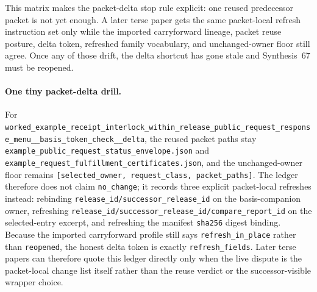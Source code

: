 \documentclass[11pt]{article}
\begin{document}
This matrix makes the packet-delta stop rule explicit: one reused predecessor packet is not yet enough. A later terse paper gets the same packet-local refresh instruction set only while the imported carryforward lineage, packet reuse posture, delta token, refreshed family vocabulary, and unchanged-owner floor still agree. Once any of those drift, the delta shortcut has gone stale and Synthesis~67 must be reopened.\cite{series:workedexample}

\paragraph{One tiny packet-delta drill.}
For \nolinkurl{worked_example_receipt_interlock_within_release_public_request_response_menu__basis_token_check__delta}, the reused packet paths stay \nolinkurl{example_public_request_status_envelope.json} and \nolinkurl{example_request_fulfillment_certificates.json}, and the unchanged-owner floor remains \nolinkurl{[selected_owner, request_class, packet_paths]}. The ledger therefore does not claim \nolinkurl{no_change}; it records three explicit packet-local refreshes instead: rebinding \nolinkurl{release_id/successor_release_id} on the basis-companion owner, refreshing \nolinkurl{release_id/successor_release_id/compare_report_id} on the selected-entry excerpt, and refreshing the manifest \nolinkurl{sha256} digest binding. Because the imported carryforward profile still says \nolinkurl{refresh_in_place} rather than \nolinkurl{reopened}, the honest delta token is exactly \nolinkurl{refresh_fields}. Later terse papers can therefore quote this ledger directly only when the live dispute is the packet-local change list itself rather than the reuse verdict or the successor-visible wrapper choice.\cite{series:workedexample}
\end{document}
